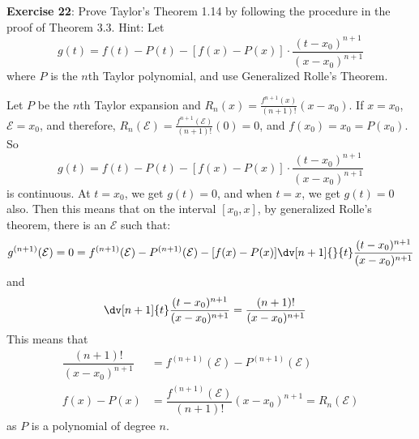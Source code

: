 \documentclass{article}
\begin{document}
\textbf{Exercise 22}: Prove Taylor's Theorem 1.14 by following the procedure in the proof of Theorem $3.3$. Hint: Let
    \begin{equation*}
        g(t) = f(t) - P(t) - [f(x) - P(x)] \cdot \dfrac{(t - x_{0})^{n + 1}}{(x - x_{0})^{n + 1}}
    \end{equation*}
where $P$ is the $n$th Taylor polynomial, and use Generalized Rolle's Theorem.
    \begin{answer}
        Let $P$ be the $n$th Taylor expansion and $R_{n}(x) = \frac{f^{n + 1}(x)}{(n + 1)!}(x - x_{0})$. If $x = x_{0}$, $\mathcal{E} = x_{0}$, and therefore, $R_{n}(\mathcal{E}) = \frac{f^{n + 1}(\mathcal{E})}{(n + 1)!}(0) = 0$, and $f(x_{0}) = x_{0} = P(x_{0})$. So
            \begin{equation*}
                g(t) = f(t) - P(t) - [f(x) - P(x)] \cdot \dfrac{(t - x_{0})^{n + 1}}{(x - x_{0})^{n + 1}}
            \end{equation*}
        is continuous. At $t = x_{0}$, we get $g(t) = 0$, and when $t = x$, we get $g(t) = 0$ also. Then this means that on the interval $[x_{0}, x]$, by generalized Rolle's theorem, there is an $\mathcal{E}$ such that:
            \begin{equation*}
                g^{(n + 1)}(\mathcal{E}) = 0 = f^{(n + 1)}(\mathcal{E}) - P^{(n + 1)}(\mathcal{E}) - [f(x) - P(x)] \dv[n + 1]{}{t} \dfrac{(t - x_{0})^{n + 1}}{(x - x_{0})^{n + 1}}
            \end{equation*}
        and
            \begin{align*}
                \dv[n + 1]{t}\dfrac{(t - x_{0})^{n + 1}}{(x - x_{0})^{n + 1}} &= \dfrac{(n + 1)!}{(x - x_{0})^{n + 1}}   
            \end{align*}
        This means that
            \begin{align*}
                [f(x) - P(x)] \dfrac{(n + 1)!}{(x - x_{0})^{n + 1}} &= f^{(n + 1)}(\mathcal{E}) - P^{(n + 1)}(\mathcal{E})           \\
                f(x) - P(x)                                         &= \dfrac{f^{(n + 1)}(\mathcal{E})}{(n + 1)!}(x - x_{0})^{n + 1} = R_{n}(\mathcal{E})
            \end{align*}
        as $P$ is a polynomial of degree $n$.
    \end{answer}
\end{document}
